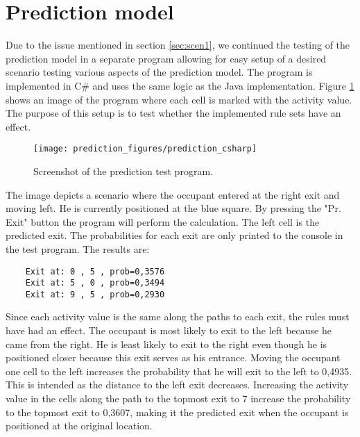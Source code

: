 \section{Prediction model}
\label{eval_prediction}
Due to the issue mentioned in section \ref{sec:scen1}, we continued the testing of the prediction model in a separate program allowing for easy setup of a desired scenario testing various aspects of the prediction model. The program is implemented in C\# and uses the same logic as the Java implementation. Figure \ref{fig:pred_c} shows an image of the program where each cell is marked with the activity value. The purpose of this setup is to test whether the implemented rule sets have an effect.
\begin{figure}[htb]
	\centering
	\texttt{[image: prediction\_figures/prediction\_csharp]}
	\caption{Screenshot of the prediction test program.}
	\label{fig:pred_c}
\end{figure}
The image depicts a scenario where the occupant entered at the right exit and moving left. He is currently positioned at the blue square. By pressing the "Pr. Exit" button the program will perform the calculation. The left cell is the predicted exit. The probabilities for each exit are only printed to the console in the test program. The results are:
\begin{verbatim}
    Exit at: 0 , 5 , prob=0,3576
    Exit at: 5 , 0 , prob=0,3494
    Exit at: 9 , 5 , prob=0,2930
\end{verbatim}
Since each activity value is the same along the paths to each exit, the rules must have had an effect. The occupant is most likely to exit to the left because he came from the right. He is least likely to exit to the right even though he is positioned closer because this exit serves as his entrance. Moving the occupant one cell to the left increases the probability that he will exit to the left to 0,4935. This is intended as the distance to the left exit decreases. Increasing the activity value in the cells along the path to the topmost exit to 7 increase the probability to the topmost exit to 0,3607, making it the predicted exit when the occupant is positioned at the original location.